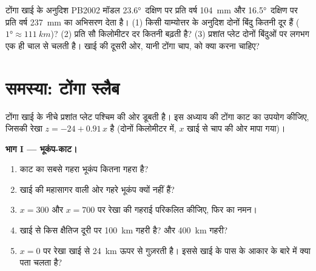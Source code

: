 \begin{exercise}[$\star\star\star$]\label{exo:g11:subduction-zones:15}
टोंगा खाई के अनुदिश PB2002 मॉडल \ang{23.6}~दक्षिण पर प्रति वर्ष \qty{104}{mm}
और \ang{16.5}~दक्षिण पर प्रति वर्ष \qty{237}{mm} का अभिसरण देता है। (1) किसी याम्योत्तर के
अनुदिश दोनों बिंदु कितनी दूर हैं
($\ang{1} \approx \qty{111}{km}$)? (2) प्रति सौ किलोमीटर दर कितनी
बढ़ती है? (3) प्रशांत प्लेट दोनों बिंदुओं पर लगभग एक ही चाल से चलती है।
खाई की दूसरी ओर, यानी टोंगा चाप, को क्या करना चाहिए?
\end{exercise}

\section{समस्या: टोंगा स्लैब}

\begin{problem}
\label{pb:g11:subduction-zones:1}
टोंगा खाई के नीचे प्रशांत प्लेट पश्चिम की ओर डूबती है। इस अध्याय की टोंगा
काट का उपयोग कीजिए, जिसकी रेखा $z = -24 + 0.91\,x$ है (दोनों
किलोमीटर में, $x$ खाई से चाप की ओर मापा गया)।

\medskip
\noindent\textbf{भाग I --- भूकंप-काट।}
\begin{enumerate}
  \item काट का सबसे गहरा भूकंप कितना गहरा है?
  \item खाई की महासागर वाली ओर गहरे भूकंप क्यों नहीं हैं?
  \item $x = 300$ और $x = 700$ पर रेखा की गहराई परिकलित कीजिए, फिर
         का नमन।
  \item खाई से किस क्षैतिज दूरी पर 
        \qty{100}{km} गहरी है? और \qty{400}{km} गहरी?
  \item $x = 0$ पर रेखा खाई से \qty{24}{km} ऊपर से गुज़रती है। इससे
        खाई के पास  के आकार के बारे में क्या पता चलता है?
\end{enumerate}


\end{problem}
